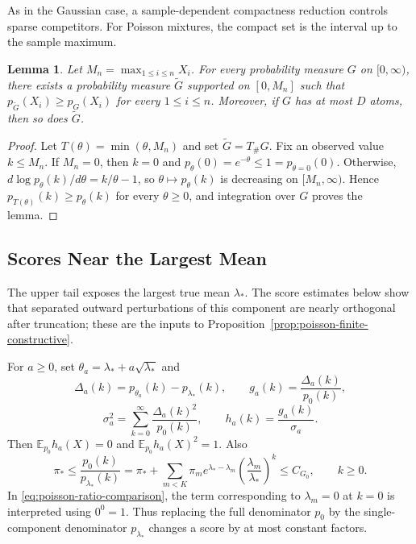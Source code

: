 \documentclass[11pt]{article}
\newtheorem{lemma}[theorem]{Lemma}
\theoremstyle{definition}
\numberwithin{equation}{section}
\newcommand{\E}{\mathbb{E}}
\begin{document}
As in the Gaussian case, a sample-dependent compactness reduction controls sparse competitors. For Poisson mixtures, the compact set is the interval up to the sample maximum.

\begin{lemma}
\label{lem:poisson-support}
Let \(M_n=\max_{1\le i\le n}X_i\). For every probability measure \(G\) on \([0,\infty)\), there exists a probability measure \(\widetilde G\) supported on \([0,M_n]\) such that \(p_{\widetilde G}(X_i)\ge p_G(X_i)\) for every \(1\le i\le n\). Moreover, if \(G\) has at most \(D\) atoms, then so does \(\widetilde G\).
\end{lemma}

\begin{proof}
Let \(T(\theta)=\min(\theta,M_n)\) and set \(\widetilde G=T_\#G\). Fix an observed value \(k\le M_n\). If \(M_n=0\), then \(k=0\) and \(p_\theta(0)=e^{-\theta}\le1=p_{\theta=0}(0)\). Otherwise, \(d\log p_\theta(k)/d\theta=k/\theta-1\), so \(\theta\mapsto p_\theta(k)\) is decreasing on \([M_n,\infty)\). Hence \(p_{T(\theta)}(k)\ge p_\theta(k)\) for every \(\theta\ge0\), and integration over \(G\) proves the lemma.
\end{proof}

\subsection{Scores Near the Largest Mean}
\label{sec:poisson-largest-mean-scores}

The upper tail exposes the largest true mean \(\lambda_*\). The score estimates
below show that separated outward perturbations of this component are nearly
orthogonal after truncation; these are the inputs to
Proposition~\ref{prop:poisson-finite-constructive}.

For \(a\ge0\), set \(\theta_a=\lambda_*+a\sqrt{\lambda_*}\) and
\[
    \Delta_a(k)=p_{\theta_a}(k)-p_{\lambda_*}(k),
    \qquad
    g_a(k)=\frac{\Delta_a(k)}{p_0(k)},
\]
\[
    \sigma_a^2=\sum_{k=0}^\infty\frac{\Delta_a(k)^2}{p_0(k)},
    \qquad
    h_a(k)=\frac{g_a(k)}{\sigma_a}.
\]
Then \(\E_{p_0}h_a(X)=0\) and \(\E_{p_0}h_a(X)^2=1\). Also
\begin{equation}
\label{eq:poisson-ratio-comparison}
    \pi_*
    \le
    \frac{p_0(k)}{p_{\lambda_*}(k)}
    =
    \pi_*+
    \sum_{m<K}\pi_m e^{\lambda_* -\lambda_m}
    \left(\frac{\lambda_m}{\lambda_*}\right)^k
    \le C_{G_0},
    \qquad k\ge0.
\end{equation}
In \eqref{eq:poisson-ratio-comparison}, the term corresponding to
\(\lambda_m=0\) at \(k=0\) is interpreted using \(0^0=1\).
Thus replacing the full denominator \(p_0\) by the single-component
denominator \(p_{\lambda_*}\) changes a score by at most constant factors.
\end{document}
